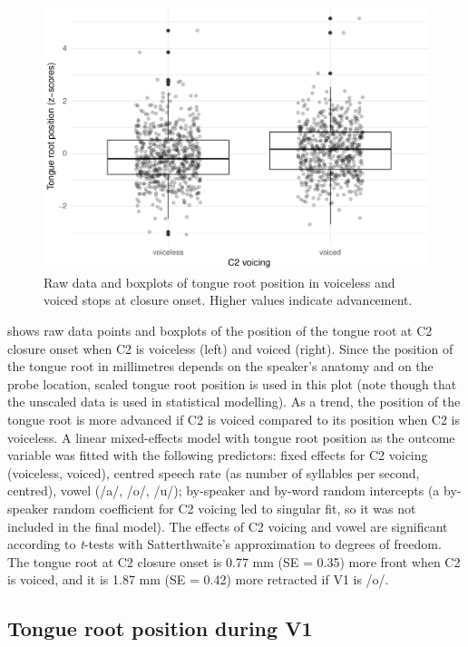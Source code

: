 \documentclass[12pt,]{article}
\begin{document}
\begin{figure}
\includegraphics[width=\linewidth]{2018-tra_files/figure-latex/trp-z-box-1} \caption{Raw data and boxplots of tongue root position in voiceless and voiced stops at closure onset. Higher values indicate advancement.}\label{f:trp-z-box}
\end{figure}

 shows raw data points and boxplots of the position of
the tongue root at C2 closure onset when C2 is voiceless (left) and
voiced (right). Since the position of the tongue root in millimetres
depends on the speaker's anatomy and on the probe location, scaled
tongue root position is used in this plot (note though that the unscaled
data is used in statistical modelling). As a trend, the position of the
tongue root is more advanced if C2 is voiced compared to its position
when C2 is voiceless. A linear mixed-effects model with tongue root
position as the outcome variable was fitted with the following
predictors: fixed effects for C2 voicing (voiceless, voiced), centred
speech rate (as number of syllables per second, centred), vowel (/a/,
/o/, /u/); by-speaker and by-word random intercepts (a by-speaker random
coefficient for C2 voicing led to singular fit, so it was not included
in the final model). The effects of C2 voicing and vowel are significant
according to \emph{t}-tests with Satterthwaite's approximation to
degrees of freedom. The tongue root at C2 closure onset is 0.77 mm (SE =
0.35) more front when C2 is voiced, and it is 1.87 mm (SE = 0.42) more
retracted if V1 is /o/.

\hypertarget{tongue-root-position-during-v1}{%
\subsection{Tongue root position during
V1}\label{tongue-root-position-during-v1}}
\end{document}
